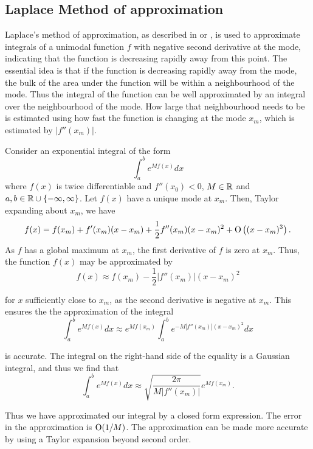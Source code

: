 \subsection{Laplace Method of approximation}
\label{sec:laplace_approximation}
Laplace's method of approximation, as described in \cite{butler_2007} or \cite{MacKay:2002:ITI:971143}, is
used to approximate integrals of a unimodal function $f$ with negative second derivative at the mode,
indicating that the function is decreasing rapidly away from this point. The essential idea is that if the
function is decreasing rapidly away from the mode, the bulk of the area under the function will be within a
neighbourhood of the mode. Thus the integral of the function can be well approximated by an integral over the
neighbourhood of the mode. How large that neighbourhood needs to be is estimated using how fast the function
is changing at the mode $x_m$, which is estimated by $|f''(x_m)|$.

Consider an exponential integral of the form
$$
	\int_a^b e^{M f(x)} dx
$$
\noindent where $f(x)$ is twice differentiable and $f''(x_0) < 0$, $M \in {\mathbb{R}}$ and $a, b \in {\mathbb{R}} \cup \{-\infty,
\infty\}$. Let $f(x)$ have a unique mode at $x_m$. Then, Taylor expanding about $x_m$, we have
$$
	f(x) = f(x_m) + f'(x_m) (x - x_m) + \frac{1}{2} f''(x_m) (x - x_m)^2 + \text{O}\left((x - x_m)^3\right).
$$
\noindent As $f$ has a global maximum at $x_m$, the first derivative of $f$ is zero at $x_m$. Thus, the
function $f(x)$ may be approximated by
$$
	f(x) \approx f(x_m) - \frac{1}{2} |f''(x_m)| (x - x_m)^2
$$

\noindent for $x$ sufficiently close to $x_m$, as the second derivative is negative at $x_m$. This ensures the
the approximation of the integral
$$
	\int_a^b e^{M f(x)} dx \approx e^{M f(x_m)} \int_a^b e^{-M |f''(x_m)|(x - x_m)^2} dx
$$

\noindent is accurate. The integral on the right-hand side of the equality is a Gaussian integral, and thus we
find that
$$
	\int_a^b e^{M f(x)} dx \approx \sqrt{\frac{2 \pi}{M |f''(x_m)|}} e^{M f(x_m)}.
$$

\noindent Thus we have approximated our integral by a closed form expression. The error in the approximation
is $\text{O}(1/M)$. The approximation can be made more accurate by using a Taylor expansion beyond second order.

